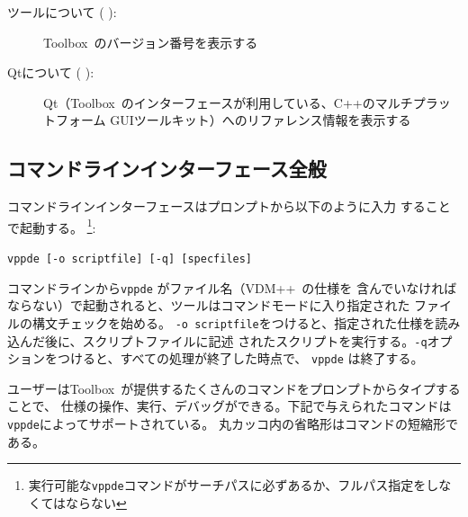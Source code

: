 \documentclass[\pformat,12pt]{jarticle}
\newcommand{\vdmslpp}{VDM++}
\newcommand{\Toolbox}{Toolbox}
\newcommand{\vdmde}{vppde}
\newcommand{\guicmd}[1]{{\gt #1}}
\begin{document}
\begin{description}

 \item[\guicmd{ツールについて} (\hspace{-1.8mm}
):]
  \Toolbox\ のバージョン番号を表示する

 \item[\guicmd{Qtについて}  (\hspace{-1.8mm}
):]
  Qt（\Toolbox\ のインターフェースが利用している、C++のマルチプラットフォーム
  GUIツールキット）へのリファレンス情報を表示する

\end{description}


\subsection{コマンドラインインターフェース全般}\label{subsec:maincommand}


コマンドラインインターフェースはプロンプトから以下のように入力 することで起動する。
\footnote{実行可能な{\tt \vdmde}コマンドがサーチパスに必ずあるか、フルパス指定をしなくてはならない}:

{\tt \vdmde\ [-o scriptfile] [-q] [specfiles]}

コマンドラインから{\tt \vdmde} がファイル名（\vdmslpp\ の仕様を
含んでいなければならない）で起動されると、ツールはコマンドモードに入り指定された
ファイルの構文チェックを始める。
{\tt -o scriptfile}をつけると、指定された仕様を読み込んだ後に、スクリプトファイルに記述
されたスクリプトを実行する。{\tt -q}オプションをつけると、すべての処理が終了した時点で、
{\tt \vdmde} は終了する。

ユーザーは\Toolbox\ が提供するたくさんのコマンドをプロンプトからタイプすることで、
仕様の操作、実行、デバッグができる。下記で与えられたコマンドは{\tt \vdmde}によってサポートされている。
丸カッコ内の省略形はコマンドの短縮形である。
\end{document}
